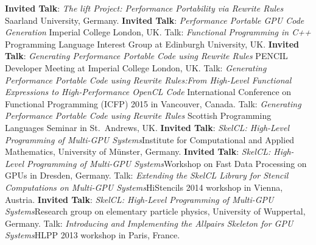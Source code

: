 \documentclass[11pt,a4paper]{moderncv}
\newcommand{\strong}[1]{\textcolor{color1}{\textbf{#1}}}
\begin{document}
         {\strong{Invited Talk}: \emph{The lift Project: Performance Portability via Rewrite Rules}\newline
          \small Saarland University, Germany.}
         {\strong{Invited Talk}: \emph{Performance Portable GPU Code Generation}\newline
         \small Imperial College London, UK.}
         {Talk: \emph{Functional Programming in C++}\newline
         \small Programming Language Interest Group at Edinburgh University, UK.}
         {\strong{Invited Talk}: \emph{Generating Performance Portable Code using Rewrite Rules}\newline
         \small PENCIL Developer Meeting at Imperial College London, UK.}
         {Talk: \emph{Generating Performance Portable Code using Rewrite Rules:\newline From High-Level Functional Expressions to High-Performance OpenCL Code}\newline
         \small International Conference on Functional Programming (ICFP) 2015 in Vancouver, Canada.}
         {Talk: \emph{Generating Performance Portable Code using Rewrite Rules}\newline
         \small Scottish Programming Languages Seminar in St.\ Andrews, UK.}
         {\strong{Invited Talk}: \emph{SkelCL\@: High-Level Programming of Multi-GPU
          Systems}\newline \small Institute for Computational and Applied
          Mathematics, University of Münster, Germany.}
         {\strong{Invited Talk}: \emph{SkelCL\@: High-Level Programming of Multi-GPU
          Systems}\newline \small Workshop on Fast Data Processing on GPUs in
          Dresden, Germany.}
         {Talk: \emph{Extending the SkelCL Library for Stencil
          Computations on Multi-GPU Systems}\newline \small HiStencils 2014
          workshop in Vienna, Austria.}
         {\strong{Invited Talk}: \emph{SkelCL\@: High-Level Programming of Multi-GPU
          Systems}\newline \small Research group on elementary particle physics,
          University of Wuppertal, Germany.}
         {Talk: \emph{Introducing and Implementing the Allpairs Skeleton for GPU
          Systems}\newline \small HLPP 2013 workshop in Paris, France.}
\end{document}

